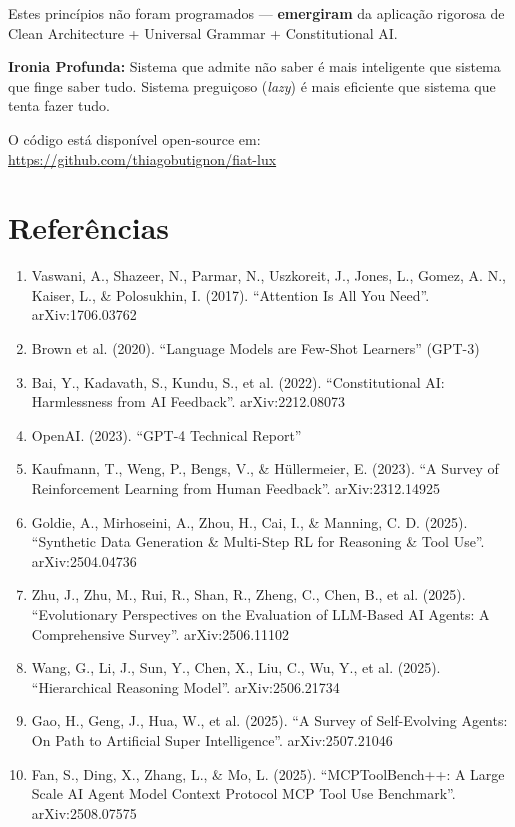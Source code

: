 \documentclass[11pt]{article}
\begin{document}
Estes princípios não foram programados --- \textbf{emergiram} da aplicação rigorosa de Clean Architecture + Universal Grammar + Constitutional AI.

\textbf{Ironia Profunda:} Sistema que admite não saber é mais inteligente que sistema que finge saber tudo. Sistema preguiçoso (\textit{lazy}) é mais eficiente que sistema que tenta fazer tudo.

O código está disponível open-source em:
\url{https://github.com/thiagobutignon/fiat-lux}

\section*{Referências}

\begin{enumerate}
    \item Vaswani, A., Shazeer, N., Parmar, N., Uszkoreit, J., Jones, L., Gomez, A. N., Kaiser, L., \& Polosukhin, I. (2017). ``Attention Is All You Need''. arXiv:1706.03762
    \item Brown et al. (2020). ``Language Models are Few-Shot Learners'' (GPT-3)
    \item Bai, Y., Kadavath, S., Kundu, S., et al. (2022). ``Constitutional AI: Harmlessness from AI Feedback''. arXiv:2212.08073
    \item OpenAI. (2023). ``GPT-4 Technical Report''
    \item Kaufmann, T., Weng, P., Bengs, V., \& Hüllermeier, E. (2023). ``A Survey of Reinforcement Learning from Human Feedback''. arXiv:2312.14925
    \item Goldie, A., Mirhoseini, A., Zhou, H., Cai, I., \& Manning, C. D. (2025). ``Synthetic Data Generation \& Multi-Step RL for Reasoning \& Tool Use''. arXiv:2504.04736
    \item Zhu, J., Zhu, M., Rui, R., Shan, R., Zheng, C., Chen, B., et al. (2025). ``Evolutionary Perspectives on the Evaluation of LLM-Based AI Agents: A Comprehensive Survey''. arXiv:2506.11102
    \item Wang, G., Li, J., Sun, Y., Chen, X., Liu, C., Wu, Y., et al. (2025). ``Hierarchical Reasoning Model''. arXiv:2506.21734
    \item Gao, H., Geng, J., Hua, W., et al. (2025). ``A Survey of Self-Evolving Agents: On Path to Artificial Super Intelligence''. arXiv:2507.21046
    \item Fan, S., Ding, X., Zhang, L., \& Mo, L. (2025). ``MCPToolBench++: A Large Scale AI Agent Model Context Protocol MCP Tool Use Benchmark''. arXiv:2508.07575

\end{enumerate}
\end{document}
